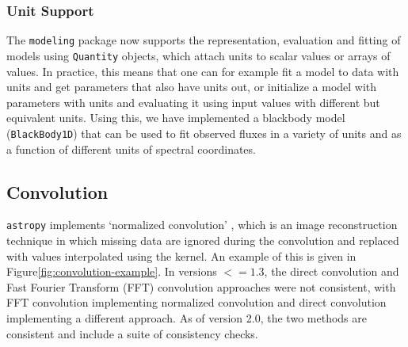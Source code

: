 \documentclass[modern]{aastex61}
\newcommand{\package}[1]{\texttt{#1}\xspace}
\newcommand{\astropypkg}{\package{astropy}}
\renewcommand{\figurename}{Figure\xspace}
\begin{document}
\subsubsection{Unit Support}

The \package{modeling} package now supports the representation, evaluation and fitting of models using \texttt{Quantity} objects, which attach units to scalar values or arrays of values. In practice, this means that one can for example fit a model to data with units and get parameters that also have units out, or initialize a model with parameters with units and evaluating it using input values with different but equivalent units. Using this, we have implemented a blackbody model (\texttt{BlackBody1D}) that can be used to fit observed fluxes in a variety of units and as a function of different units of spectral coordinates.

\subsection{Convolution}

\astropypkg implements `normalized convolution' \citep[e.g.,][]{Knutsson1993}, which is an image reconstruction technique in which missing data are ignored during the convolution and replaced with values interpolated using the kernel.   An example of this is given in \figurename \ref{fig:convolution-example}.  In versions $<=1.3$, the direct convolution and Fast Fourier Transform (FFT) convolution approaches were not consistent, with FFT convolution implementing normalized convolution and direct convolution implementing a different approach.  As of version 2.0, the two methods are consistent and include a suite of consistency checks.
\end{document}
